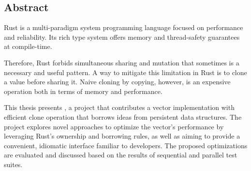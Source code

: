\vspace*{2cm}
\thispagestyle{plain}

{}

\begin{center}
\section*{Abstract}
\end{center}

Rust is a multi-paradigm system programming language focused on performance and reliability. Its rich type system offers memory and thread-safety guarantees at compile-time.

Therefore, Rust forbids simultaneous sharing and mutation that sometimes is a necessary and useful pattern. A way to mitigate this limitation in Rust is to clone a value before sharing it. Naive cloning by copying, however, is an expensive operation both in terms of memory and performance.

This thesis presents \pvecrs{}, a project that contributes a vector implementation with efficient clone operation that borrows ideas from persistent data structures. The project explores novel approaches to optimize the vector's performance by leveraging Rust's ownership and borrowing rules, as well as aiming to provide a convenient, idiomatic interface familiar to developers. The proposed optimizations are evaluated and discussed based on the results of sequential and parallel test suites.
